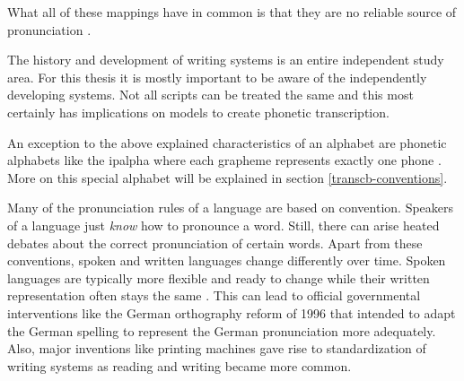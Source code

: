 What all of these mappings have in common is that they are no reliable source of pronunciation \citep{Intro.2007}.

The history and development of writing systems is an entire independent study area. For this thesis it is mostly important to be aware of the independently developing systems. Not all scripts can be treated the same and this most certainly has implications on models to create phonetic transcription. 

An exception to the above explained characteristics of an alphabet are phonetic alphabets like the \ac{ipalpha} where each grapheme represents exactly one phone  \citep{writing-systems, Intro.2007}. More on this special alphabet will be explained in section \ref{transcb-conventions}.

Many of the pronunciation rules of a language are based on convention. Speakers of a language just \textit{know} how to pronounce a word. Still, there can arise heated debates about the correct pronunciation of certain words.  Apart from these conventions, spoken and written languages change differently over time. Spoken languages are typically more flexible and ready to change while their written representation often stays the same \citep{unicode-lingu}. This can lead to official governmental interventions like the German orthography reform of 1996 that intended to adapt the German spelling to represent the German pronunciation more adequately. Also, major inventions like printing machines gave rise to standardization of writing systems as reading and writing became more common.

